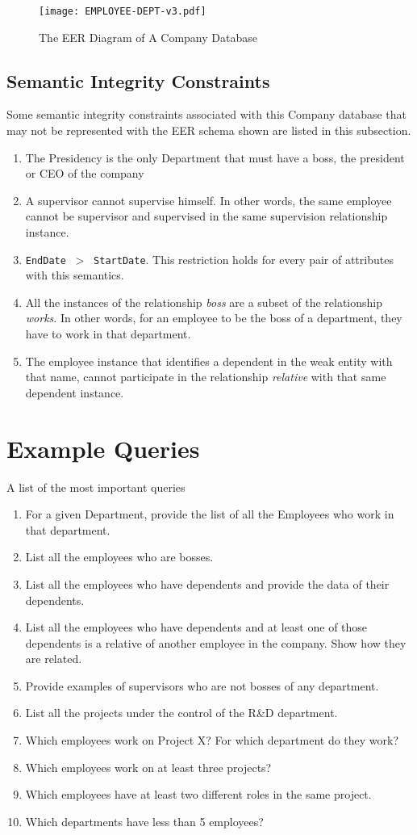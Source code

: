 \documentclass[11pt]{article}
\newcommand{\benum}{\begin{enumerate}}
\newcommand{\eenum}{\end{enumerate}}
\begin{document}
\begin{figure}[h!]
 \centering
 \texttt{[image: EMPLOYEE-DEPT-v3.pdf]}
  \caption{The EER Diagram of A Company Database \label{sgm}}
\end{figure}

\newpage

\subsection{Semantic Integrity Constraints}
\noindent
Some semantic integrity constraints associated with this Company database that may not be represented with the EER schema shown are listed in this subsection.

\begin{enumerate}
\item The Presidency is the only Department that must have a boss, the president or CEO of the company 
\item A supervisor cannot supervise himself. In other words, the same employee cannot be supervisor and supervised in the same supervision relationship instance.
\item \verb|EndDate| $~>~$ \verb|StartDate|. This restriction holds for every pair of attributes with this semantics.
\item All the instances of the relationship {\em boss} are a subset of the relationship {\em works}. In other words, for an employee to be the boss of a department, they have to work in that department.
\item The employee instance that identifies a dependent in the weak entity with that name, cannot participate in the relationship {\em relative} with that same dependent instance.
\end{enumerate}

\newpage
\section{Example Queries}
\noindent
A list of the most important queries 
\benum
\item For a given Department, provide the list of all the Employees who work in that department.
\item List all the employees who are bosses.
\item List all the employees who have dependents and provide the data of their dependents.
\item List all the employees who have dependents and at least one of those dependents is a relative of another employee in the company. Show how they are related.
\item  Provide examples of supervisors who are not bosses of any department.
\item List all the projects under the control of the R\&D department.
  \item Which employees work on Project X? For which department do they work?
\item Which employees work on at least three projects?
\item Which employees have at least two different roles in the same project.
\item Which departments have less than 5 employees?
\eenum
\end{document}
